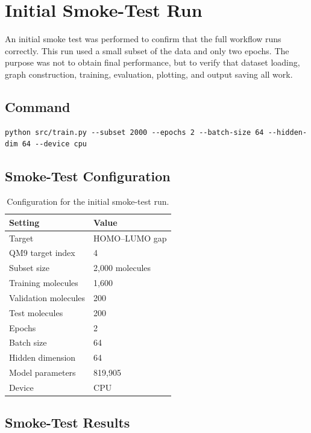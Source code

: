 \documentclass[11pt]{article}
\begin{document}
\section{Initial Smoke-Test Run}

An initial smoke test was performed to confirm that the full workflow runs correctly. This run used a small subset of the data and only two epochs. The purpose was not to obtain final performance, but to verify that dataset loading, graph construction, training, evaluation, plotting, and output saving all work.

\subsection{Command}

\begin{lstlisting}
python src/train.py --subset 2000 --epochs 2 --batch-size 64 --hidden-dim 64 --device cpu
\end{lstlisting}

\subsection{Smoke-Test Configuration}

\begin{table}[h!]
\centering
\begin{tabular}{ll}
\toprule
Setting & Value \\
\midrule
Target & HOMO--LUMO gap \\
QM9 target index & 4 \\
Subset size & 2,000 molecules \\
Training molecules & 1,600 \\
Validation molecules & 200 \\
Test molecules & 200 \\
Epochs & 2 \\
Batch size & 64 \\
Hidden dimension & 64 \\
Model parameters & 819,905 \\
Device & CPU \\
\bottomrule
\end{tabular}
\caption{Configuration for the initial smoke-test run.}
\end{table}

\subsection{Smoke-Test Results}
\end{document}
